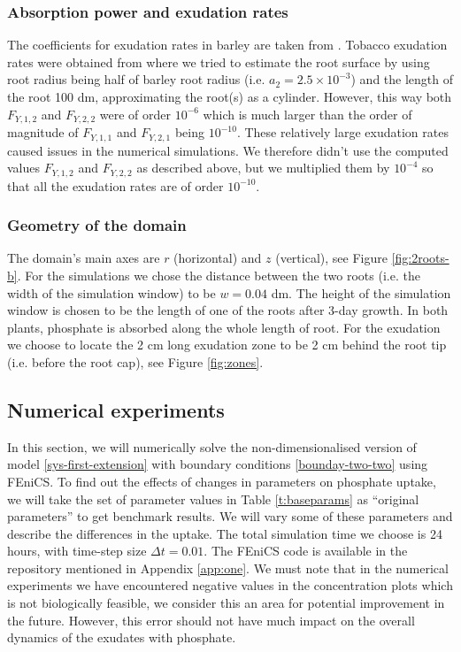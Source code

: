 \documentclass[11pt]{article}
\numberwithin{equation}{section}
\begin{document}
\subsubsection{Absorption power and exudation rates}
The coefficients for exudation rates in barley are taken from \cite{Ruiz-2020}. Tobacco exudation rates were obtained from \cite{giles_george} where we tried to estimate the root surface by using root radius being half of barley root radius (i.e. $a_2 = 2.5 \times 10^{-3}$) and the length of the root 100 \si{dm}, approximating the root(s) as a cylinder. However, this way both $F_{Y,1,2}$ and $F_{Y,2,2}$ were of order $10^{-6}$ which is much larger than the order of magnitude of $F_{Y,1,1}$ and $F_{Y,2,1}$ being $10^{-10}$. These relatively large exudation rates caused issues in the numerical simulations. We therefore didn't use the computed values $F_{Y,1,2}$ and $F_{Y,2,2}$ as described above, but we multiplied them by $10^{-4}$ so that all the exudation rates are of order $10^{-10}$.

\subsubsection{Geometry of the domain}
The domain's main axes are $r$ (horizontal) and $z$ (vertical), see Figure \ref{fig:2roots-b}. For the simulations we chose the distance between the two roots (i.e. the width of the simulation window) to be $w = 0.04$ \si{dm}. The height of the simulation window is chosen to be the length of one of the roots after 3-day growth. In both plants, phosphate is absorbed along the whole length of root. For the exudation we choose to locate the 2 \si{cm} long exudation zone to be 2 \si{cm} behind the root tip (i.e. before the root cap), see Figure \ref{fig:zones}.

\subsection{Numerical experiments}
\label{sec:extended_exper}
In this section, we will numerically solve the non-dimensionalised version of model \eqref{sys-first-extension} with boundary conditions \eqref{bounday-two-two} using FEniCS. To find out the effects of changes in parameters on phosphate uptake, we will take the set of parameter values in Table \ref{t:baseparams} as ``original parameters'' to get benchmark results. We will vary some of these parameters and describe the differences in the uptake. The total simulation time we choose is 24 hours, with time-step size $\Delta t = 0.01$. The FEniCS code is available in the repository mentioned in Appendix \ref{app:one}. We must note that in the numerical experiments we have encountered negative values in the concentration plots which is not biologically feasible, we consider this an area for potential improvement in the future. However, this error should not have much impact on the overall dynamics of the exudates with phosphate.
\end{document}
